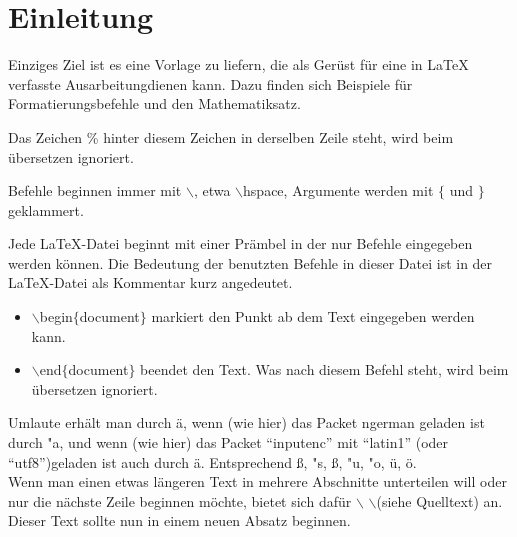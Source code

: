 \section{Einleitung}

Einziges Ziel ist
es eine Vorlage zu liefern, die als Gerüst für eine in LaTeX verfasste
Ausarbeitung\footnotemark dienen kann. Dazu finden sich Beispiele für
Formatierungsbefehle und den Mathematiksatz.



Das Zeichen \% %
hinter diesem Zeichen in derselben Zeile steht, wird beim \"ubersetzen
ignoriert.

Befehle beginnen immer mit $\backslash$, etwa $\backslash$hspace, Argumente
werden mit $\{$ und $\}$ geklammert.

Jede LaTeX-Datei beginnt mit einer Prämbel in der nur Befehle eingegeben werden
können. Die Bedeutung der benutzten Befehle in dieser Datei ist in der
LaTeX-Datei als Kommentar kurz angedeutet.

\begin{itemize}
\item $\backslash$begin$\{$document$\}$ markiert den Punkt ab dem Text
eingegeben werden kann.
\item $\backslash$end$\{$document$\}$ beendet den Text. Was nach diesem Befehl steht, wird beim übersetzen ignoriert.
\end{itemize}

Umlaute erhält man durch \"a, wenn (wie hier) das Packet ngerman
geladen ist durch "a, und wenn (wie hier) das Packet ``inputenc'' mit ``latin1'' (oder ``utf8'')geladen ist auch durch ä. Entsprechend \ss, "s, ß, "u, "o, ü, ö.\\


Wenn man einen etwas längeren Text in mehrere Abschnitte unterteilen will oder nur die nächste Zeile beginnen möchte, bietet sich dafür $\backslash$ $\backslash$(siehe Quelltext) an.\\

Dieser Text sollte nun in einem neuen Absatz beginnen.





